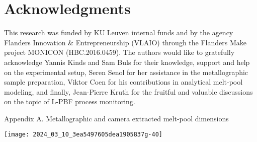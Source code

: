 \documentclass[10pt]{article}
\begin{document}
\section*{Acknowledgments}
This research was funded by KU Leuven internal funds and by the agency Flanders Innovation \& Entrepreneurship (VLAIO) through the Flanders Make project MONICON (HBC.2016.0459). The authors would like to gratefully acknowledge Yannis Kinds and Sam Buls for their knowledge, support and help on the experimental setup, Seren Senol for her assistance in the metallographic sample preparation, Viktor Coen for his contributions in analytical melt-pool modeling, and finally, Jean-Pierre Kruth for the fruitful and valuable discussions on the topic of L-PBF process monitoring.

Appendix A. Metallographic and camera extracted melt-pool dimensions

\begin{center}
\texttt{[image: 2024\_03\_10\_3ea5497605dea1905837g-40]}
\end{center}
\end{document}

